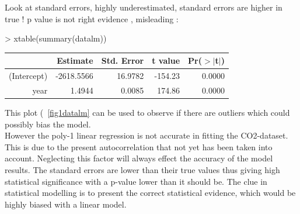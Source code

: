 \documentclass[11pt, a4paper]{article} %
\begin{document}
Look at standard errors, highly underestimated, standard errors are higher in true ! p value is not right evidence , misleading :
\begin{Schunk}
\begin{Sinput}
> xtable(summary(datalm))
\end{Sinput}
\begin{table}[ht]
\centering
\begin{tabular}{rrrrr}
  \hline
 & Estimate & Std. Error & t value & Pr($>$$|$t$|$) \\ 
  \hline
(Intercept) & -2618.5566 & 16.9782 & -154.23 & 0.0000 \\ 
  year & 1.4944 & 0.0085 & 174.86 & 0.0000 \\ 
   \hline
\end{tabular}
\end{table}\end{Schunk}
\noindent This plot (~\ref{fig1datalm} can be used to observe if there are outliers which could possibly bias the model. \\
However the poly-1 linear regression is not accurate in fitting the CO2-dataset. This is due to the present autocorrelation that not yet has been taken into account. Neglecting this factor will always effect the accuracy of the model results. The standard errors are lower than their true values thus giving high statistical significance with a p-value lower than it should be. The clue in statistical modelling is to present the correct statistical evidence, which would be highly biased with a linear model.\\
\end{document}
